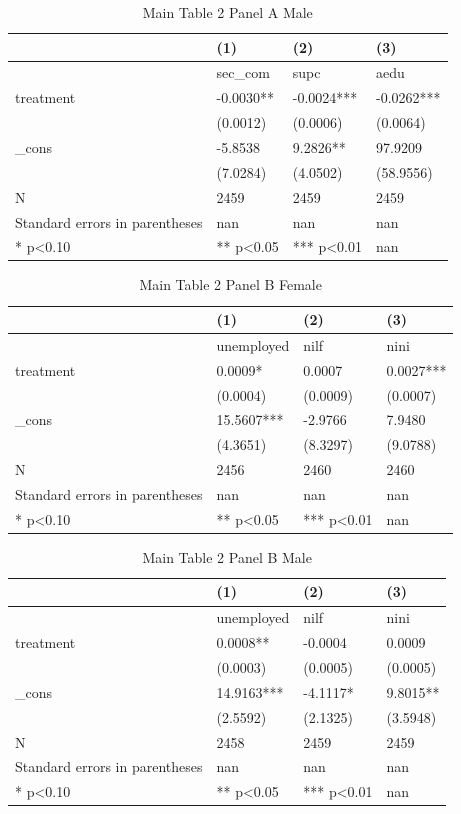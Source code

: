 \documentclass[11pt]{article}
\begin{document}
\clearpage
\begin{table}[!htbp]
\centering
\caption{Main Table 2 Panel A Male}
\label{tab:table2a_m}
\begin{tabular}{llll}
\toprule
 & (1) & (2) & (3) \\
\midrule
 & sec\_com & supc & aedu \\
treatment & -0.0030** & -0.0024*** & -0.0262*** \\
 & (0.0012) & (0.0006) & (0.0064) \\
\_cons & -5.8538 & 9.2826** & 97.9209 \\
 & (7.0284) & (4.0502) & (58.9556) \\
N & 2459 & 2459 & 2459 \\
Standard errors in parentheses & nan & nan & nan \\
* p<0.10 & ** p<0.05 & *** p<0.01 & nan \\
\bottomrule
\end{tabular}

\end{table}

\clearpage
\begin{table}[!htbp]
\centering
\caption{Main Table 2 Panel B Female}
\label{tab:table2b_f}
\begin{tabular}{llll}
\toprule
 & (1) & (2) & (3) \\
\midrule
 & unemployed & nilf & nini \\
treatment & 0.0009* & 0.0007 & 0.0027*** \\
 & (0.0004) & (0.0009) & (0.0007) \\
\_cons & 15.5607*** & -2.9766 & 7.9480 \\
 & (4.3651) & (8.3297) & (9.0788) \\
N & 2456 & 2460 & 2460 \\
Standard errors in parentheses & nan & nan & nan \\
* p<0.10 & ** p<0.05 & *** p<0.01 & nan \\
\bottomrule
\end{tabular}

\end{table}

\clearpage
\begin{table}[!htbp]
\centering
\caption{Main Table 2 Panel B Male}
\label{tab:table2b_m}
\begin{tabular}{llll}
\toprule
 & (1) & (2) & (3) \\
\midrule
 & unemployed & nilf & nini \\
treatment & 0.0008** & -0.0004 & 0.0009 \\
 & (0.0003) & (0.0005) & (0.0005) \\
\_cons & 14.9163*** & -4.1117* & 9.8015** \\
 & (2.5592) & (2.1325) & (3.5948) \\
N & 2458 & 2459 & 2459 \\
Standard errors in parentheses & nan & nan & nan \\
* p<0.10 & ** p<0.05 & *** p<0.01 & nan \\
\bottomrule
\end{tabular}

\end{table}
\end{document}
